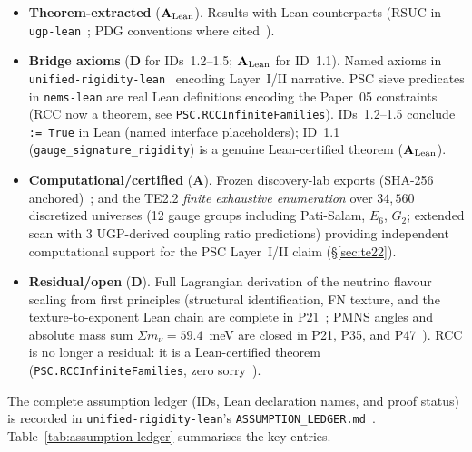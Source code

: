 \documentclass[11pt,twocolumn]{article}
\newcommand{\CatA}{\textbf{A}}
\newcommand{\CatAL}{\ensuremath{\textbf{A}_{\rm Lean}}}
\newcommand{\CatD}{\textbf{D}}
\theoremstyle{remark}
\begin{document}
\begin{itemize}
\item \textbf{Theorem-extracted} ($\CatAL$). Results with Lean counterparts (RSUC in \texttt{ugp-lean}~\cite{ugp-lean,SpivackUGPFormalization}; PDG conventions where cited~\cite{ParticleDataGroup2022}).
\item \textbf{Bridge axioms} ($\CatD$ for IDs~1.2--1.5; $\CatAL$ for ID~1.1). Named axioms in \texttt{unified-rigidity-lean}~\cite{unified-rigidity-lean}
  encoding Layer~I/II narrative. PSC sieve predicates in \texttt{nems-lean} are real Lean
  definitions encoding the Paper~05 constraints (RCC now a theorem, see \texttt{PSC.RCCInfiniteFamilies}).
  IDs~1.2--1.5 conclude \texttt{:=~True} in Lean (named interface placeholders); ID~1.1
  (\texttt{gauge\_signature\_rigidity}) is a genuine Lean-certified theorem ($\CatAL$).
\item \textbf{Computational/certified} ($\CatA$). Frozen discovery-lab exports (SHA-256 anchored)~\cite{ugp-physics-repo};
  and the TE2.2 \emph{finite exhaustive enumeration} over $34{,}560$ discretized universes
  (12 gauge groups including Pati-Salam, $E_6$, $G_2$; extended scan with 3 UGP-derived
  coupling ratio predictions)
  providing independent computational support for the PSC Layer~I/II claim (§\ref{sec:te22}).
\item \textbf{Residual/open} ($\CatD$). Full Lagrangian derivation of the neutrino flavour scaling from first principles (structural identification, FN texture, and the texture-to-exponent Lean chain are complete in P21~\cite{SpivackNeutrino}; PMNS angles and absolute mass sum $\Sigma m_\nu = 59.4$~meV are closed in P21, P35, and P47~\cite{SpivackGTEUnification,SpivackGTECosmology}). RCC is no longer a residual: it is a Lean-certified theorem (\texttt{PSC.RCCInfiniteFamilies}, zero sorry~\cite{ugp-lean}).
\end{itemize}

The complete assumption ledger (IDs, Lean declaration names, and proof status) is recorded in
\texttt{unified-rigidity-lean}'s \texttt{ASSUMPTION\_LEDGER.md}~\cite{unified-rigidity-lean}.
Table~\ref{tab:assumption-ledger} summarises the key entries.
\end{document}
